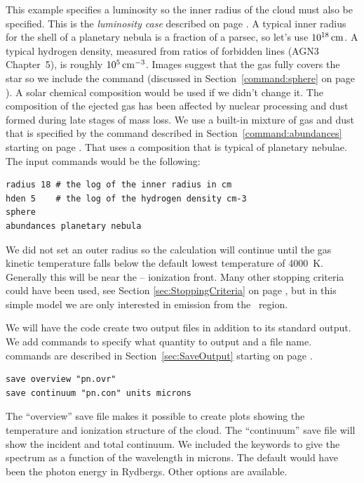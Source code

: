 \documentclass[12pt,twoside]{article}
\begin{document}
{This example specifies a luminosity so the inner radius of the cloud
must also be specified.
This is the \emph{luminosity case} described on
page \pageref{sec:LuminosityVsIntensityCases}.
A typical inner radius for the shell of a planetary nebula is a fraction
of a parsec, so let's use $10^{18} {\rm\thinspace cm}$.
A typical hydrogen density, measured
from ratios of forbidden lines (AGN3 Chapter~5),
is roughly $10^5 {\rm\thinspace cm^{-3}}$.
Images suggest that the gas fully covers the star so we include the
 command (discussed in Section~\ref{command:sphere}
on page \pageref{command:sphere}).
A solar chemical composition would be used if we didn't change it.
The composition of
the ejected gas has been affected by nuclear processing and
dust formed during late stages of mass loss.
We use a built-in mixture of gas and dust that is specified
by the  command
described in Section~\ref{command:abundances} starting
on page \pageref{command:abundances}.
That uses a composition that is typical of planetary nebulae.
The input commands would be the following:
\small
\begin{verbatim}
radius 18 # the log of the inner radius in cm
hden 5    # the log of the hydrogen density cm-3
sphere
abundances planetary nebula
\end{verbatim}
\normalsize
We did not set an outer radius so the calculation will continue until the
gas kinetic temperature falls below the default
lowest temperature of 4000~K.
Generally this will be near the \hplus -- \hO ionization front.
Many other stopping criteria
could have been used, see Section \ref{sec:StoppingCriteria}
on page \pageref{sec:StoppingCriteria}, but in
this simple model we are only interested in
emission from the \hplus\ region.

We will have the code create two output files in addition to its standard
output.
We add  commands to specify what quantity
to output and a file name.
 commands are described in Section~\ref{sec:SaveOutput}
starting on page \pageref{sec:SaveOutput}.
\small
\begin{verbatim}
save overview "pn.ovr"
save continuum "pn.con" units microns
\end{verbatim}
\normalsize
The ``overview'' save file makes it possible to create plots showing the
temperature and ionization structure of the cloud.  The ``continuum'' save
file will show the incident and total continuum.  We included the keywords
 to give the spectrum
as a function of the wavelength in
microns.
The default would have been the photon energy in Rydbergs.
Other options are available.

}
\end{document}
